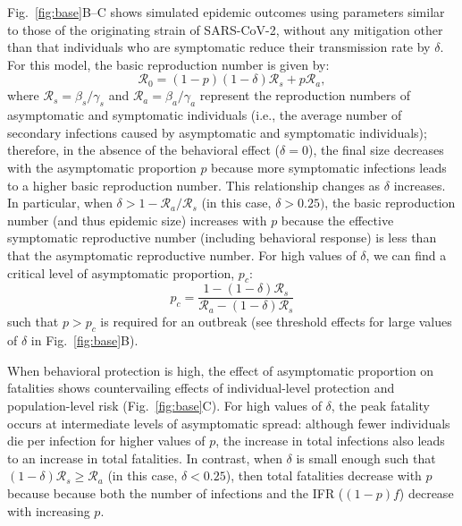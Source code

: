 \documentclass[12pt]{article}
\newcommand{\fref}[1]{Fig.~\ref{fig:#1}}
\newcommand{\RR}{\ensuremath{{\mathcal R}}\xspace}
\begin{document}
\fref{base}B--C shows simulated epidemic outcomes using parameters similar to those of the originating strain of SARS-CoV-2, without any mitigation other than that individuals who are symptomatic reduce their transmission rate by $\delta$. 
For this model, the basic reproduction number is given by:
\begin{equation}
\RR_0 = (1-p) (1-\delta) \RR_s + p \RR_a,
\end{equation}
where $\RR_s = \beta_s/\gamma_s$ and $\RR_a = \beta_a/\gamma_a$ represent the reproduction numbers of asymptomatic and symptomatic individuals (i.e., the average number of secondary infections caused by asymptomatic and symptomatic individuals);
therefore, in the absence of the behavioral effect ($\delta=0$), the final size decreases with the asymptomatic proportion $p$ because more symptomatic infections leads to a higher basic reproduction number.
This relationship changes as $\delta$ increases.
In particular, when $\delta > 1-\RR_a/\RR_s$ (in this case, $\delta > 0.25)$, the basic reproduction number (and thus epidemic size) increases with $p$ because the effective symptomatic reproductive number (including behavioral response) is less than that the asymptomatic reproductive number.
For high values of $\delta$, we can find a critical level of asymptomatic proportion, $p_c$:
\begin{equation}
    p_c = \frac{1 - (1-\delta) \RR_s}{\RR_a - (1-\delta) \RR_s}
\end{equation}
such that $p>p_c$ is required for an outbreak (see threshold effects for large values of $\delta$ in \fref{base}B).

When behavioral protection is high, the effect of asymptomatic proportion on fatalities shows countervailing effects of individual-level protection and population-level risk (\fref{base}C).
For high values of $\delta$, the peak fatality occurs at intermediate levels of asymptomatic spread:
although fewer individuals die per infection for higher values of $p$, the increase in total infections also leads to an increase in total fatalities.
In contrast, when $\delta$ is small enough such that $(1-\delta) \RR_s \geq \RR_a$ (in this case, $\delta < 0.25$), then total fatalities decrease with $p$ because because both the number of infections and the IFR ($(1-p)f$) decrease with increasing $p$.
\end{document}
